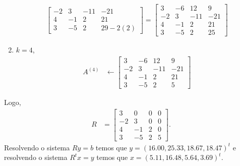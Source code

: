 \documentclass[a4paper,12pt, leqno, answers]{exam}
\begin{document}
\begin{questions}
\begin{solution}
\begin{enumerate}
\begin{align*}
\begin{bmatrix}
                        -2 & 3 & -11 & -21 \\
                        4 & -1 & 2 & 21 \\
                        3 & -5 & 2 & 29 - 2(2)
                    \end{bmatrix} = \begin{bmatrix}
                        3 & -6 & 12 & 9 \\
                        -2 & 3 & -11 & -21 \\
                        4 & -1 & 2 & 21 \\
                        3 & -5 & 2 & 25
                    \end{bmatrix}
               \end{align*}
           \item $k = 4$,
               \begin{align*}
                   A^{(4)} &\leftarrow \begin{bmatrix}
                        3 & -6 & 12 & 9 \\
                        -2 & 3 & -11 & -21 \\
                        4 & -1 & 2 & 21 \\
                        3 & -5 & 2 & 5
                    \end{bmatrix}
               \end{align*}
        \end{enumerate}
        Logo,
        \begin{align*}
            R &= \begin{bmatrix}
                3 & 0 & 0 & 0 \\
                -2 & 3 & 0 & 0 \\
                4 & -1 & 2  & 0\\
                3 & -5 & 2 & 5
            \end{bmatrix}.
        \end{align*}
        Resolvendo o sistema $R y = b$ temos que $y = (16.00, 25.33, 18.67, 18.47)^t$ e resolvendo o sistema $R^t x = y$ temos que $x = (5.11, 16.48, 5.64, 3.69)^t$.
     \end{solution}


\end{questions}
\end{document}
